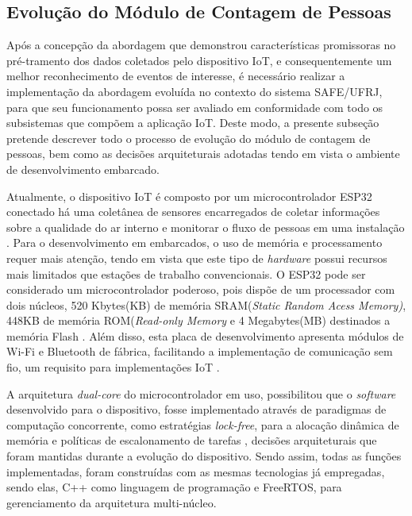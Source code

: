 \subsection{Evolução do Módulo de Contagem de Pessoas}
\label{subsec:module_implementation}
Após a concepção da abordagem que demonstrou características promissoras no pré-tramento dos dados coletados pelo dispositivo IoT, e consequentemente um melhor reconhecimento de eventos de interesse, é necessário realizar a implementação da abordagem evoluída no contexto do sistema SAFE/UFRJ, para que seu funcionamento possa ser avaliado em conformidade com todo os subsistemas que compõem a aplicação IoT. Deste modo, a presente subseção pretende descrever todo o processo de evolução do módulo de contagem de pessoas, bem como as decisões arquiteturais adotadas tendo em vista o ambiente de desenvolvimento embarcado.

Atualmente, o dispositivo IoT é composto por um microcontrolador ESP32 conectado há uma coletânea de sensores encarregados de coletar informações sobre a qualidade do ar interno e monitorar o fluxo de pessoas em uma instalação \cite{SAFE-IOT}. Para o desenvolvimento em embarcados, o uso de memória e processamento requer mais atenção, tendo em vista que este tipo de \textit{hardware} possui recursos mais limitados que estações de trabalho convencionais. O ESP32 pode ser considerado um microcontrolador poderoso, pois dispõe de um processador com dois núcleos, 520 Kbytes(KB) de memória SRAM(\textit{Static Random Acess Memory)}, 448KB de memória ROM(\textit{Read-only Memory} e 4 Megabytes(MB) destinados a memória Flash \cite{hercog_design_2023}. Além disso, esta placa de desenvolvimento apresenta módulos de Wi-Fi e Bluetooth de fábrica, facilitando a implementação de comunicação sem fio, um requisito para implementações IoT \cite{motta_evidence-based_2023}.

A arquitetura \textit{dual-core} do microcontrolador em uso, possibilitou que o \textit{software} desenvolvido para o dispositivo, fosse implementado através de paradigmas de computação concorrente, como estratégias \textit{lock-free}, para a alocação dinâmica de memória e políticas de escalonamento de tarefas \cite{kim_lwmalloc_2025, lee_fast_2011}, decisões arquiteturais que foram mantidas durante a evolução do dispositivo. Sendo assim, todas as funções implementadas, foram construídas com as mesmas tecnologias já empregadas, sendo elas, C++ como linguagem de programação e FreeRTOS, para gerenciamento da arquitetura multi-núcleo.

